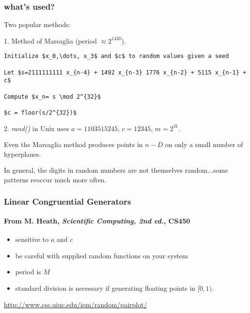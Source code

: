 \documentclass[10pt]{beamer}
\begin{document}
\begin{frame}[fragile]
\frametitle{what's used?}
Two popular methods:

1. Method of Marsaglia (period $\approx 2^{1430}$).
\begin{lstlisting}[mathescape]
Initialize $x_0,\dots, x_3$ and $c$ to random values given a seed

Let $s=2111111111 x_{n-4} + 1492 x_{n-3} 1776 x_{n-2} + 5115 x_{n-1} + c$

Compute $x_n= s \mod 2^{32}$

$c = floor(s/2^{32})$
\end{lstlisting}
\bigskip

2. \emph{rand()} in Unix uses $a=1103515245$, $c=12345$, $m=2^{31}$.
\bigskip

\begin{alertblock}{}
    Even the Marsaglia method produces points in $n-D$ on only a small number of
hyperplanes.
\end{alertblock}
\begin{alertblock}{}
    In general, the digits in random numbers are not themselves random...some
patterns reoccur much more often.
\end{alertblock}
\end{frame}
\begin{frame}
\frametitle{Linear Congruential Generators}
\framesubtitle{From M. Heath, \emph{Scientific Computing, 2nd ed.}, CS450}
\begin{itemize}
    \item sensitive to $a$ and $c$
    \item be careful with supplied random functions on your system
    \item period is $M$
    \item standard division is necessary if generating floating points in
$[0,1)$.
\end{itemize}
\bigskip

\url{http://www.cse.uiuc.edu/iem/random/pairplot/}
\end{frame}
\end{document}
